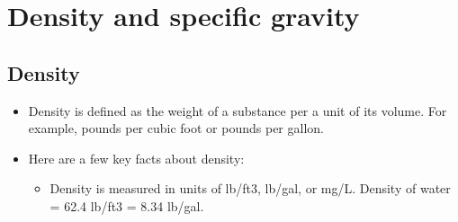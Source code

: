 \section{Density and specific gravity}


\subsection{Density}
\begin{itemize}
\item Density is defined as the weight of a substance per a unit of its volume. For example, pounds per cubic foot or pounds per gallon.

\item Here are a few key facts about density:
\begin{itemize}

\item Density is measured in units of lb/ft3, lb/gal, or mg/L. Density of water = 62.4 lb/ft3 = 8.34 lb/gal.
\end{itemize}
\end{itemize}

